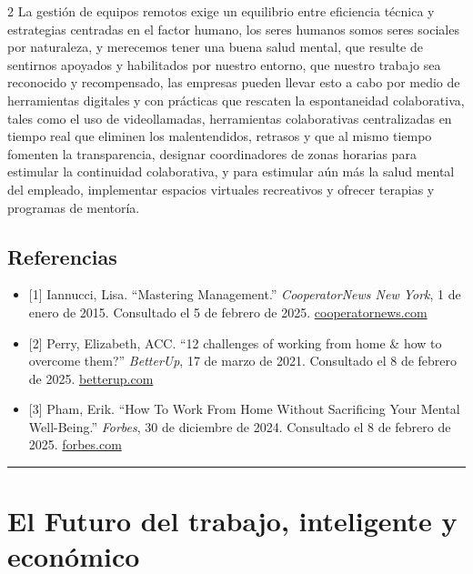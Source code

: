 \documentclass[12pt,spanish,Letterpaper,openany]{book}
\newcommand{\HRule}{\begin{center}\rule{0.5\linewidth}{0.2mm}\end{center}}
\begin{document}
\begin {multicols}{2}
La gestión de equipos remotos exige un equilibrio entre eficiencia técnica y estrategias
centradas en el factor humano, los seres humanos somos seres sociales por naturaleza, y
merecemos tener una buena salud mental, que resulte de sentirnos apoyados y habilitados por
nuestro entorno, que nuestro trabajo sea reconocido y recompensado, las empresas pueden
llevar esto a cabo por medio de herramientas digitales y con prácticas que rescaten la
espontaneidad colaborativa, tales como el uso de videollamadas, herramientas colaborativas
centralizadas en tiempo real que eliminen los malentendidos, retrasos y que al mismo tiempo
fomenten la transparencia, designar coordinadores de zonas horarias para estimular la
continuidad colaborativa, y para estimular aún más la salud mental del empleado,
implementar espacios virtuales recreativos y ofrecer terapias y programas de mentoría.

\hypertarget{referencias-14}{%
\section{Referencias}\label{referencias-14}}

\begin{itemize}
\item
  {[}1{]} Iannucci, Lisa. ``Mastering Management.'' \emph{CooperatorNews New York}, 1 de enero de 2015. Consultado el 5 de febrero de 2025. \href{https://cooperatornews.com/article/mastering-management}{cooperatornews.com}
\item
  {[}2{]} Perry, Elizabeth, ACC. ``12 challenges of working from home \& how to overcome them?'' \emph{BetterUp}, 17 de marzo de 2021. Consultado el 8 de febrero de 2025. \href{https://www.betterup.com/blog/challenges-of-working-from-home}{betterup.com}
\item
  {[}3{]} Pham, Erik. ``How To Work From Home Without Sacrificing Your Mental Well-Being.'' \emph{Forbes}, 30 de diciembre de 2024. Consultado el 8 de febrero de 2025. \href{https://www.forbes.com/councils/forbesbusinesscouncil/2024/12/30/how-to-work-from-home-without-sacrificing-your-mental-well-being}{forbes.com}
\end{itemize}

\end {multicols}

\medskip

\HRule

\medskip

\hypertarget{pareja57}{%
\chapter{El Futuro del trabajo, inteligente y económico}\label{pareja57}}
\end{document}
